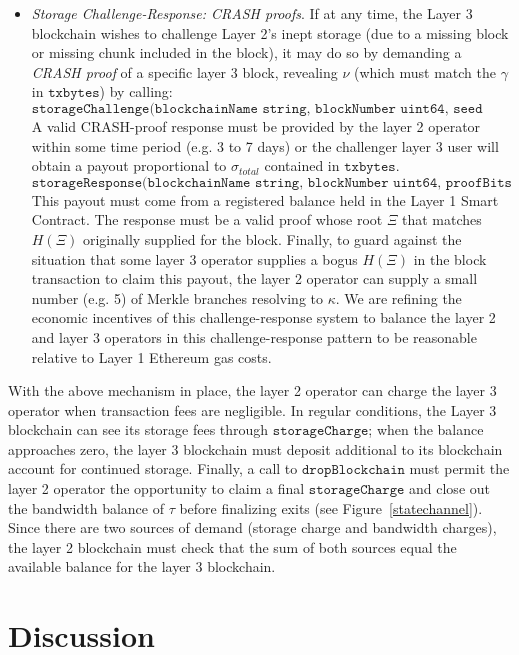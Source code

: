 \documentclass{article}
\newcommand{\keyroot}{\kappa}
\newcommand{\hash}[1]{H(#1)}
\newcommand{\seedhash}{\gamma}
\newcommand{\seed}{\nu}
\begin{document}
\begin{itemize}
    \item {\em Storage Challenge-Response: CRASH proofs}. If at any time, the Layer 3 blockchain wishes to challenge Layer 2's inept storage (due to a missing block or missing chunk included in the block), it may do so by demanding a {\em CRASH proof} of a specific layer 3 block, revealing $\seed$ (which must match the $\seedhash$ in $\texttt{txbytes}$) by calling:
    \[
    \texttt{storageChallenge(blockchainName string, blockNumber uint64, seed bytes32)}
    \]
    A valid CRASH-proof response must be provided by the layer 2 operator within some time period (e.g. 3 to 7 days) or the challenger layer 3 user will obtain a payout proportional to $\sigma_{total}$ contained in $\texttt{txbytes}$.
    \[
    \texttt{storageResponse(blockchainName string, blockNumber uint64, proofBits uint64, proofBytes bytes)}
    \]
    This payout must come from a registered balance held in the Layer 1 Smart Contract.  The response must be a valid proof whose root $\Xi$ that matches $\hash{\Xi}$ originally supplied for the block.   Finally, to guard against the situation that some layer 3 operator supplies a bogus $\hash{\Xi}$ in the block transaction to claim this payout, the layer 2 operator can supply a small number (e.g. 5) of Merkle branches resolving to $\keyroot$.  We are refining the economic incentives of this challenge-response system to balance the layer 2 and layer 3 operators in this challenge-response pattern to be reasonable relative to Layer 1 Ethereum gas costs.
\end{itemize}
With the above mechanism in place, the layer 2 operator can charge the layer 3 operator when transaction fees are negligible.  In regular conditions, the Layer 3 blockchain  can see its storage fees through $\texttt{storageCharge}$; when the balance approaches zero, the layer 3 blockchain must deposit additional to its blockchain account for continued storage.  Finally, a call to $\texttt{dropBlockchain}$ must permit the layer 2 operator the opportunity to claim a final $\texttt{storageCharge}$ and close out the bandwidth balance of $\tau$ before  finalizing exits (see Figure~\ref{statechannel}).  Since there are two sources of demand (storage charge and bandwidth charges), the layer 2 blockchain must check that the sum of both sources equal the available balance for the layer 3 blockchain.

\section{Discussion}
\end{document}
